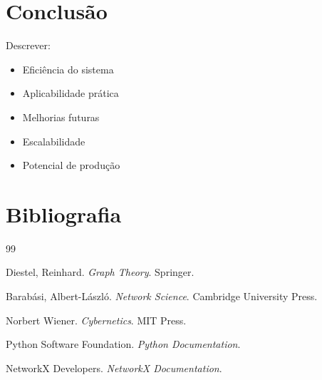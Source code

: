 \documentclass[12pt,a4paper]{article}
\begin{document}

\section{Conclusão}

Descrever:
\begin{itemize}

    \item Eficiência do sistema
    \item Aplicabilidade prática
    \item Melhorias futuras
    \item Escalabilidade
    \item Potencial de produção

\end{itemize}


\section{Bibliografia}

\begin{thebibliography}{99}

Diestel, Reinhard.
\textit{Graph Theory}.
Springer.

Barabási, Albert-László.
\textit{Network Science}.
Cambridge University Press.

Norbert Wiener.
\textit{Cybernetics}.
MIT Press.

Python Software Foundation.
\textit{Python Documentation}.

NetworkX Developers.
\textit{NetworkX Documentation}.

\end{thebibliography}

\end{document}
